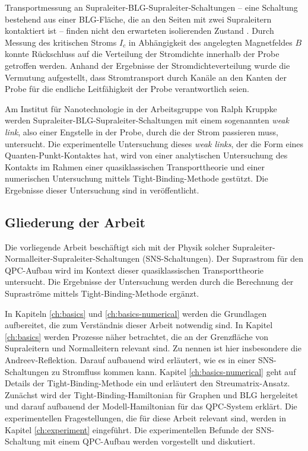 Transportmessung an Supraleiter-BLG-Supraleiter-Schaltungen -- eine Schaltung bestehend aus einer BLG-Fl\"ache, die an den Seiten mit zwei Supraleitern kontaktiert ist -- finden nicht den erwarteten isolierenden Zustand \cite{Zhu2017}. Durch Messung des kritischen Stroms $I_c$ in Abh\"angigkeit des angelegten Magnetfeldes $B$ konnte R\"uckschluss auf die Verteilung der Stromdichte innerhalb der Probe getroffen werden. Anhand der Ergebnisse der Stromdichteverteilung wurde die Vermutung aufgestellt, dass Stromtransport durch Kan\"ale an den Kanten der Probe f\"ur die endliche Leitf\"ahigkeit der Probe verantwortlich seien. 

Am Institut f\"ur Nanotechnologie in der Arbeitsgruppe von Ralph Kruppke werden Supraleiter-BLG-Supraleiter-Schaltungen mit einem sogenannten \emph{weak link}, also einer Engstelle in der Probe, durch die der Strom passieren muss, untersucht. Die experimentelle Untersuchung dieses \emph{weak links}, der die Form eines Quanten-Punkt-Kontaktes hat, wird von einer analytischen Untersuchung des Kontakts im Rahmen einer quasiklassischen Transporttheorie und einer numerischen Untersuchung mittels Tight-Binding-Methode gest\"utzt. Die Ergebnisse dieser Untersuchung sind in \cite{Kraft2017} ver\"offentlicht. 


\subsection*{Gliederung der Arbeit} 

Die vorliegende Arbeit besch\"aftigt sich mit der Physik solcher Supraleiter-Normalleiter-Supraleiter-Schaltungen (SNS-Schaltungen). Der Suprastrom f\"ur den QPC-Aufbau wird im Kontext dieser quasiklassischen Transporttheorie untersucht. Die Ergebnisse der Untersuchung werden durch die Berechnung der Suprastr\"ome mittels Tight-Binding-Methode erg\"anzt.

In Kapiteln \ref{ch:basics} und  \ref{ch:basics-numerical} werden die Grundlagen aufbereitet, die zum Verst\"andnis dieser Arbeit notwendig sind. In Kapitel \ref{ch:basics} werden Prozesse n\"aher betrachtet, die an der Grenzfl\"ache von Supraleitern und Normalleitern relevant sind. Zu nennen ist hier insbesondere die Andreev-Reflektion. Darauf aufbauend wird erl\"autert, wie es in einer SNS-Schaltungen zu Stromfluss kommen kann. Kapitel  \ref{ch:basics-numerical} geht auf Details der Tight-Binding-Methode ein und erl\"autert den Streumatrix-Ansatz. Zun\"achst wird der Tight-Binding-Hamiltonian f\"ur Graphen und BLG hergeleitet und darauf aufbauend der Modell-Hamiltonian f\"ur das QPC-System erkl\"art. Die experimentellen Fragestellungen, die f\"ur diese Arbeit relevant sind, werden in Kapitel \ref{ch:experiment} eingef\"uhrt. Die experimentellen Befunde der SNS-Schaltung mit einem QPC-Aufbau werden vorgestellt und diskutiert.


